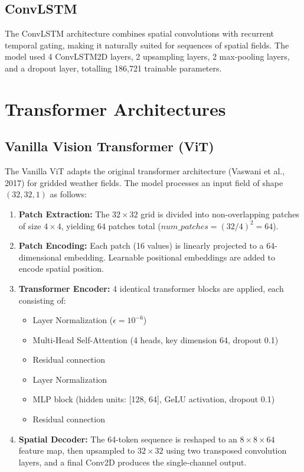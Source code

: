\documentclass[12pt,a4paper,oneside]{report}
\begin{document}
\subsection{ConvLSTM}

The ConvLSTM architecture combines spatial convolutions with recurrent temporal gating, making it naturally suited for sequences of spatial fields. The model used 4 ConvLSTM2D layers, 2 upsampling layers, 2 max-pooling layers, and a dropout layer, totalling 186,721 trainable parameters.

\section{Transformer Architectures}

\subsection{Vanilla Vision Transformer (ViT)}

The Vanilla ViT adapts the original transformer architecture (Vaswani et al., 2017) for gridded weather fields. The model processes an input field of shape $(32, 32, 1)$ as follows:

\begin{enumerate}
    \item \textbf{Patch Extraction:} The $32 \times 32$ grid is divided into non-overlapping patches of size $4 \times 4$, yielding $64$ patches total ($num\_patches = (32/4)^2 = 64$).
    \item \textbf{Patch Encoding:} Each patch (16 values) is linearly projected to a 64-dimensional embedding. Learnable positional embeddings are added to encode spatial position.
    \item \textbf{Transformer Encoder:} 4 identical transformer blocks are applied, each consisting of:
    \begin{itemize}
        \item Layer Normalization ($\epsilon = 10^{-6}$)
        \item Multi-Head Self-Attention (4 heads, key dimension 64, dropout 0.1)
        \item Residual connection
        \item Layer Normalization
        \item MLP block (hidden units: [128, 64], GeLU activation, dropout 0.1)
        \item Residual connection
    \end{itemize}
    \item \textbf{Spatial Decoder:} The 64-token sequence is reshaped to an $8 \times 8 \times 64$ feature map, then upsampled to $32 \times 32$ using two transposed convolution layers, and a final Conv2D produces the single-channel output.
\end{enumerate}
\end{document}
